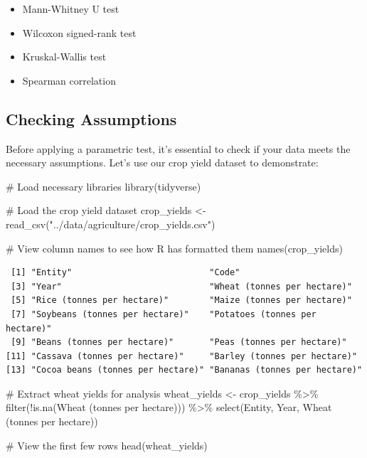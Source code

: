 \documentclass[
  letterpaper,
]{book}
\newenvironment{Shaded}{\begin{snugshade}}{\end{snugshade}}
\newcommand{\AttributeTok}[1]{\textcolor[rgb]{0.40,0.45,0.13}{#1}}
\newcommand{\CommentTok}[1]{\textcolor[rgb]{0.37,0.37,0.37}{#1}}
\newcommand{\FunctionTok}[1]{\textcolor[rgb]{0.28,0.35,0.67}{#1}}
\newcommand{\NormalTok}[1]{\textcolor[rgb]{0.00,0.23,0.31}{#1}}
\newcommand{\OtherTok}[1]{\textcolor[rgb]{0.00,0.23,0.31}{#1}}
\newcommand{\SpecialCharTok}[1]{\textcolor[rgb]{0.37,0.37,0.37}{#1}}
\newcommand{\StringTok}[1]{\textcolor[rgb]{0.13,0.47,0.30}{#1}}
\providecommand{\tightlist}{%
  \setlength{\itemsep}{0pt}\setlength{\parskip}{0pt}}
\begin{document}
\begin{itemize}
\tightlist
\item
  Mann-Whitney U test
\item
  Wilcoxon signed-rank test
\item
  Kruskal-Wallis test
\item
  Spearman correlation
\end{itemize}

\subsection{Checking Assumptions}\label{checking-assumptions}

Before applying a parametric test, it's essential to check if your data
meets the necessary assumptions. Let's use our crop yield dataset to
demonstrate:

\begin{Shaded}
\begin{Highlighting}[]
\CommentTok{\# Load necessary libraries}
\FunctionTok{library}\NormalTok{(tidyverse)}

\CommentTok{\# Load the crop yield dataset}
\NormalTok{crop\_yields }\OtherTok{\textless{}{-}} \FunctionTok{read\_csv}\NormalTok{(}\StringTok{"../data/agriculture/crop\_yields.csv"}\NormalTok{)}

\CommentTok{\# View column names to see how R has formatted them}
\FunctionTok{names}\NormalTok{(crop\_yields)}
\end{Highlighting}
\end{Shaded}

\begin{verbatim}
 [1] "Entity"                           "Code"                            
 [3] "Year"                             "Wheat (tonnes per hectare)"      
 [5] "Rice (tonnes per hectare)"        "Maize (tonnes per hectare)"      
 [7] "Soybeans (tonnes per hectare)"    "Potatoes (tonnes per hectare)"   
 [9] "Beans (tonnes per hectare)"       "Peas (tonnes per hectare)"       
[11] "Cassava (tonnes per hectare)"     "Barley (tonnes per hectare)"     
[13] "Cocoa beans (tonnes per hectare)" "Bananas (tonnes per hectare)"    
\end{verbatim}

\begin{Shaded}
\begin{Highlighting}[]
\CommentTok{\# Extract wheat yields for analysis}
\NormalTok{wheat\_yields }\OtherTok{\textless{}{-}}\NormalTok{ crop\_yields }\SpecialCharTok{\%\textgreater{}\%}
  \FunctionTok{filter}\NormalTok{(}\SpecialCharTok{!}\FunctionTok{is.na}\NormalTok{(}\StringTok{\textasciigrave{}}\AttributeTok{Wheat (tonnes per hectare)}\StringTok{\textasciigrave{}}\NormalTok{)) }\SpecialCharTok{\%\textgreater{}\%}
  \FunctionTok{select}\NormalTok{(Entity, Year, }\StringTok{\textasciigrave{}}\AttributeTok{Wheat (tonnes per hectare)}\StringTok{\textasciigrave{}}\NormalTok{)}

\CommentTok{\# View the first few rows}
\FunctionTok{head}\NormalTok{(wheat\_yields)}
\end{Highlighting}
\end{Shaded}
\end{document}
